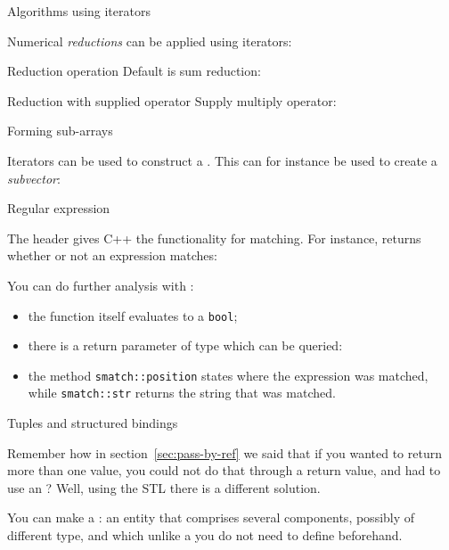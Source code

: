  {Algorithms using iterators}

Numerical \emph{reductions} can be applied using iterators:
\begin{block}{Reduction operation}
  \label{sl:vec-accumulate}
  Default is sum reduction:
\end{block}

\begin{block}{Reduction with supplied operator}
  \label{sl:vec-multiplies}
  Supply multiply operator:
\end{block}

 {Forming sub-arrays}

Iterators can be used to construct a . This can
for instance be used to create a
\emph{subvector}:
%

 {Regular expression}

The header  gives C++ the functionality for
 matching. For instance,
 returns whether or not an expression matches:


You can do further analysis with :
\begin{itemize}
\item the function itself evaluates to a \lstinline{bool};
\item there is a return parameter of type  which can
  be queried:
\item the method \lstinline{smatch::position} states where the expression
  was matched, while \lstinline{smatch::str} returns the string that
  was matched.
\end{itemize}


 {Tuples and structured bindings}
\label{sec:tuple}

Remember how in section~\ref{sec:pass-by-ref} we said that if you
wanted to return more than one value, you could not do that through a
return value, and had to use an ?
Well, using the \ac{STL} there is a different solution.

You can make a : an entity that comprises several
components, possibly of different type, and which unlike a
 you do not need to define beforehand.

